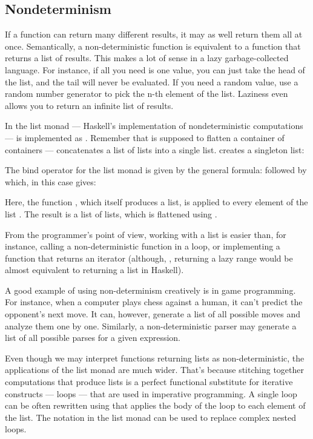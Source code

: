 \subsection{Nondeterminism}

If a function can return many different results, it may as well return
them all at once. Semantically, a non-deterministic function is
equivalent to a function that returns a list of results. This makes a
lot of sense in a lazy garbage-collected language. For instance, if all
you need is one value, you can just take the head of the list, and the
tail will never be evaluated. If you need a random value, use a random
number generator to pick the n-th element of the list. Laziness even
allows you to return an infinite list of results.

In the list monad --- Haskell's implementation of nondeterministic
computations ---  is implemented as .
Remember that  is supposed to flatten a container of
containers ---  concatenates a list of lists into a
single list.  creates a singleton list:

The bind operator for the list monad is given by the general formula:
 followed by  which, in this case gives:

Here, the function , which itself produces a list, is applied
to every element of the list . The result is a list of lists,
which is flattened using .

From the programmer's point of view, working with a list is easier than,
for instance, calling a non-deterministic function in a loop, or
implementing a function that returns an iterator (although,
, returning a lazy range would be almost equivalent to returning a
list in Haskell).

A good example of using non-determinism creatively is in game
programming. For instance, when a computer plays chess against a human,
it can't predict the opponent's next move. It can, however, generate a
list of all possible moves and analyze them one by one. Similarly, a
non-deterministic parser may generate a list of all possible parses for
a given expression.

Even though we may interpret functions returning lists as
non-deterministic, the applications of the list monad are much wider.
That's because stitching together computations that produce lists is a
perfect functional substitute for iterative constructs --- loops ---
that are used in imperative programming. A single loop can be often
rewritten using  that applies the body of the loop to each
element of the list. The  notation in the list monad can be
used to replace complex nested loops.

